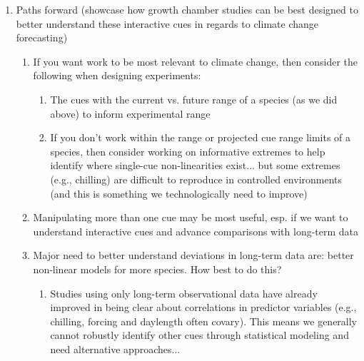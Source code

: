 \documentclass[11pt,letter]{article}
\begin{document}
\begin{enumerate}
\item Paths forward (showcase how growth chamber studies can be best designed to better understand these interactive cues in regards to climate change forecasting) 
\begin{enumerate}
\item If you want work to be most relevant to climate change, then consider the following when designing experiments:
\begin{enumerate}
\item The cues with the current vs. future range of a species (as we did above) to inform experimental range %
\item If you don't work within the range or projected cue range limits of a species, then consider working on informative extremes to help identify where single-cue non-linearities exist... but some extremes (e.g., chilling) are difficult to reproduce in controlled environments (and this is something we technologically need to improve)
\end{enumerate}
\item Manipulating more than one cue may be most useful, esp. if we want to understand interactive cues and advance comparisons with long-term data 
\item Major need to better understand deviations in long-term data are: better non-linear models for more species. How best to do this?
\begin{enumerate}
\item Studies using only long-term observational data have already improved in being clear about correlations in predictor variables (e.g., chilling, forcing and daylength often covary). This means we generally cannot robustly identify other cues through statistical modeling and need alternative approaches... %

\end{enumerate}
\end{enumerate}
\end{enumerate}
\end{document}
